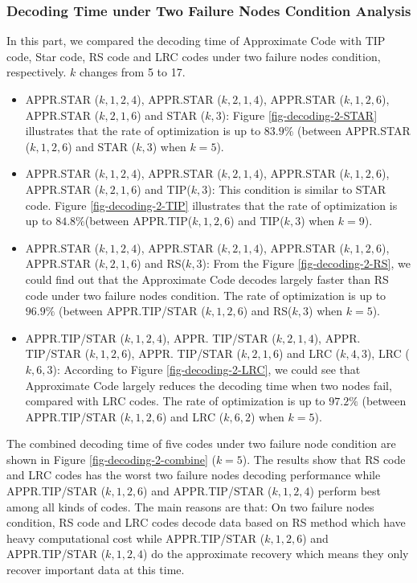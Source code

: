 \documentclass[sigconf]{acmart}
\begin{document}
\subsubsection{Decoding Time under Two Failure Nodes Condition Analysis}
In this part, we compared the decoding time of Approximate Code with TIP code, Star code, RS code and LRC codes under two failure nodes condition, respectively. $k$ changes from 5 to 17.
\begin{itemize}
    \item APPR.STAR ($k,1,2,4$), APPR.STAR ($k,2,1,4$), APPR.STAR ($k,1,2,6$), APPR.STAR ($k,2,1,6$) and STAR ($k,3$): Figure \ref{fig-decoding-2-STAR} illustrates that the rate of optimization is up to $83.9\%$ (between APPR.STAR ($k,1,2,6$) and STAR ($k,3$) when $k = 5$).
    \item APPR.STAR ($k,1,2,4$), APPR.STAR ($k,2,1,4$),  APPR.STAR ($k,1,2,6$), APPR.STAR ($k,2,1,6$) and TIP($k,3$): This condition is similar to STAR code. Figure \ref{fig-decoding-2-TIP} illustrates that the rate of optimization is up to $84.8\% $(between APPR.TIP($k,1,2,6$) and TIP($k,3$) when $k = 9$).
    \item APPR.STAR ($k,1,2,4$), APPR.STAR ($k,2,1,4$),  APPR.STAR ($k,1,2,6$), APPR.STAR ($k,2,1,6$) and RS($k,3$): From the Figure \ref{fig-decoding-2-RS}, we could find out that the Approximate Code decodes largely faster than RS code under two failure nodes condition. The rate of optimization is up to $96.9\%$ (between APPR.TIP/STAR ($k,1,2,6$) and RS($k,3$) when $k = 5$).
    \item APPR.TIP/STAR ($k,1,2,4$), APPR. TIP/STAR ($k,2,1,4$),  APPR. TIP/STAR ($k,1,2,6$), APPR. TIP/STAR ($k,2,1,6$) and LRC ($k,4,3$), LRC ($k,6,3$):
    According to Figure \ref{fig-decoding-2-LRC}, we could see that Approximate Code largely reduces the decoding time when two nodes fail, compared with LRC codes. The rate of optimization is up to $97.2\%$ (between APPR.TIP/STAR ($k,1,2,6$) and LRC ($k, 6, 2$) when $k = 5$).
\end{itemize}

The combined decoding time of five codes under two failure node condition are shown in Figure \ref{fig-decoding-2-combine} ($k=5$). The results show that RS code and LRC codes has the worst two failure nodes decoding performance while APPR.TIP/STAR ($k,1,2,6$) and APPR.TIP/STAR ($k,1,2,4$) perform best among all kinds of codes. The main reasons are that: On two failure nodes condition, RS code and LRC codes decode data based on RS method which have heavy computational cost while APPR.TIP/STAR ($k,1,2,6$) and APPR.TIP/STAR ($k,1,2,4$) do the approximate recovery which means they only recover important data at this time.
\end{document}

